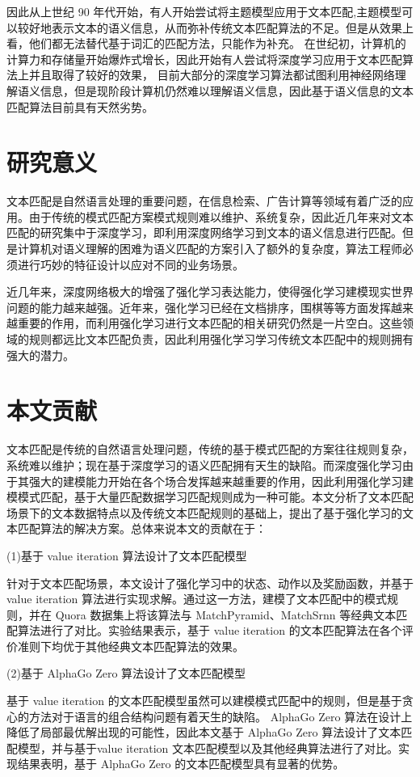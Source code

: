 因此从上世纪 90 年代开始，有人开始尝试将主题模型应用于文本匹配,主题模型可以较好地表示文本的语义信息，从而弥补传统文本匹配算法的不足。但是从效果上看，他们都无法替代基于词汇的匹配方法，只能作为补充。
在世纪初，计算机的计算力和存储量开始爆炸式增长，因此开始有人尝试将深度学习应用于文本匹配算法上并且取得了较好的效果，
目前大部分的深度学习算法都试图利用神经网络理解语义信息，但是现阶段计算机仍然难以理解语义信息，因此基于语义信息的文本匹配算法目前具有天然劣势。

\section{研究意义}
文本匹配是自然语言处理的重要问题，在信息检索、广告计算等领域有着广泛的应用。由于传统的模式匹配方案模式规则难以维护、系统复杂，因此近几年来对文本匹配的研究集中于深度学习，即利用深度网络学习到文本的语义信息进行匹配。但是计算机对语义理解的困难为语义匹配的方案引入了额外的复杂度，算法工程师必须进行巧妙的特征设计以应对不同的业务场景。

近几年来，深度网络极大的增强了强化学习表达能力，使得强化学习建模现实世界问题的能力越来越强。近年来，强化学习已经在文档排序，围棋等等方面发挥越来越重要的作用，而利用强化学习进行文本匹配的相关研究仍然是一片空白。这些领域的规则都远比文本匹配负责，因此利用强化学习学习传统文本匹配中的规则拥有强大的潜力。

\section{本文贡献}
文本匹配是传统的自然语言处理问题，传统的基于模式匹配的方案往往规则复杂，系统难以维护；现在基于深度学习的语义匹配拥有天生的缺陷。而深度强化学习由于其强大的建模能力开始在各个场合发挥越来越重要的作用，因此利用强化学习建模模式匹配，基于大量匹配数据学习匹配规则成为一种可能。本文分析了文本匹配场景下的文本数据特点以及传统文本匹配规则的基础上，提出了基于强化学习的文本匹配算法的解决方案。总体来说本文的贡献在于：

(1)基于 value iteration 算法设计了文本匹配模型

针对于文本匹配场景，本文设计了强化学习中的状态、动作以及奖励函数，并基于 value iteration 算法进行实现求解。通过这一方法，建模了文本匹配中的模式规则，并在 Quora 数据集上将该算法与 MatchPyramid、MatchSrnn 等经典文本匹配算法进行了对比。实验结果表示，基于 value iteration 的文本匹配算法在各个评价准则下均优于其他经典文本匹配算法的效果。

(2)基于 AlphaGo Zero 算法设计了文本匹配模型

基于 value iteration 的文本匹配模型虽然可以建模模式匹配中的规则，但是基于贪心的方法对于语言的组合结构问题有着天生的缺陷。 AlphaGo Zero 算法在设计上降低了局部最优解出现的可能性，因此本文基于 AlphaGo Zero 算法设计了文本匹配模型，并与基于value iteration 文本匹配模型以及其他经典算法进行了对比。实现结果表明，基于 AlphaGo Zero 的文本匹配模型具有显著的优势。

